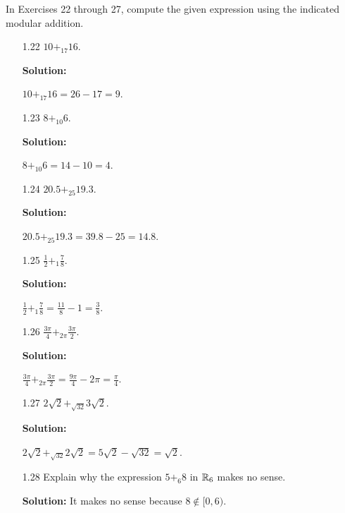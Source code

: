 \noindent In Exercises 22 through 27, compute the given expression using the
indicated modular addition.
\begin{enumerate}
   \item[1.22] $10 +_{17} 16$.
		
		\textbf{Solution:}
		
		$10 +_{17} 16 = 26 - 17 = 9$.
   \item[1.23] $8 +_{10} 6$.
		
		\textbf{Solution:}
		
		$8 +_{10} 6 = 14 - 10 = 4$.
   \item[1.24] $20.5 +_{25} 19.3$.
		
		\textbf{Solution:}
		
		$20.5 +_{25} 19.3 = 39.8 - 25 = 14.8$.
   \item[1.25] $\frac{1}{2} +_1 \frac{7}{8}$.
		
		\textbf{Solution:}
		
		$\frac{1}{2} +_1 \frac{7}{8} = \frac{11}{8} - 1 = \frac{3}{8}$.
   \item[1.26] $\frac{3\pi}{4} +_{2\pi} \frac{3\pi}{2}$.
		
		\textbf{Solution:}
		
		$\frac{3\pi}{4} +_{2\pi} \frac{3\pi}{2} =
		 \frac{9\pi}{4} - 2\pi = \frac{\pi}{4}$.
   \item[1.27] $2\sqrt{2} +_{\sqrt{32}} 3\sqrt{2}$.
		
		\textbf{Solution:}
		
		$2\sqrt{2} +_{\sqrt{32}} 2\sqrt{2} = 5\sqrt{2} - \sqrt{32} = \sqrt{2}$.
   \item[1.28] Explain why the expression $5 +_6 8$ in $\mathbb{R}_6$ makes no sense.
		
		\textbf{Solution:} It makes no sense because $8 \notin [0, 6)$.
\end{enumerate}

